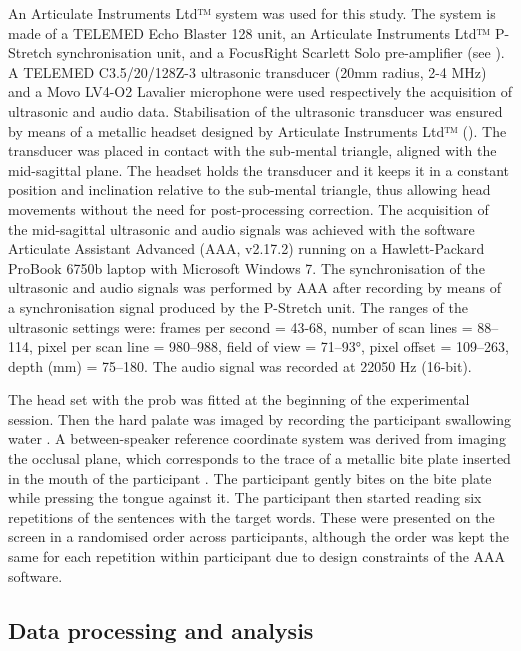 \documentclass[]{article}
\begin{document}
\label{s:equipment}

An Articulate Instruments Ltd™ system was used for this study. The
system is made of a TELEMED Echo Blaster 128 unit, an Articulate
Instruments Ltd™ P-Stretch synchronisation unit, and a FocusRight
Scarlett Solo pre-amplifier (see ). A TELEMED
C3.5/20/128Z-3 ultrasonic transducer (20mm radius, 2-4 MHz) and a Movo
LV4-O2 Lavalier microphone were used respectively the acquisition of
ultrasonic and audio data. Stabilisation of the ultrasonic transducer
was ensured by means of a metallic headset designed by Articulate
Instruments Ltd™ (\citeyear{articulate2008}). The transducer was placed
in contact with the sub-mental triangle, aligned with the mid-sagittal
plane. The headset holds the transducer and it keeps it in a constant
position and inclination relative to the sub-mental triangle, thus
allowing head movements without the need for post-processing correction.
The acquisition of the mid-sagittal ultrasonic and audio signals was
achieved with the software Articulate Assistant Advanced (AAA, v2.17.2)
running on a Hawlett-Packard ProBook 6750b laptop with Microsoft Windows
7. The synchronisation of the ultrasonic and audio signals was performed
by AAA after recording by means of a synchronisation signal produced by
the P-Stretch unit. The ranges of the ultrasonic settings were: frames
per second = 43-68, number of scan lines = 88--114, pixel per scan line
= 980--988, field of view = 71--93°, pixel offset = 109--263, depth (mm)
= 75--180. The audio signal was recorded at 22050 Hz (16-bit).

The head set with the prob was fitted at the beginning of the
experimental session. Then the hard palate was imaged by recording the
participant swallowing water \citep{epstein2005}. A between-speaker
reference coordinate system was derived from imaging the occlusal plane,
which corresponds to the trace of a metallic bite plate inserted in the
mouth of the participant \citep{scobbie2011}. The participant gently
bites on the bite plate while pressing the tongue against it. The
participant then started reading six repetitions of the sentences with
the target words. These were presented on the screen in a randomised
order across participants, although the order was kept the same for each
repetition within participant due to design constraints of the AAA
software.

\hypertarget{data-processing-and-analysis}{%
\subsection{Data processing and
analysis}\label{data-processing-and-analysis}}
\end{document}
